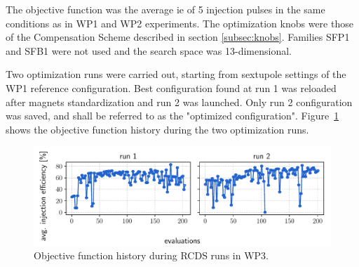 The objective function was the average \gls*{ie} of 5 injection pulses in the same conditions as in \gls*{WP1} and \gls*{WP2} experiments. The optimization knobs were those of the Compensation Scheme described in section \ref{subsec:knobs}. Families SFP1 and SFB1 were not used and the search space was 13-dimensional.

Two optimization runs were carried out, starting from sextupole settings of the \gls*{WP1} reference configuration. Best configuration found at run 1 was reloaded after magnets standardization and run 2 was launched. Only run 2 configuration was saved, and shall be referred to as the "optimized configuration". Figure~\ref{fig:wp3_history} shows the objective function history during the two optimization runs.
\begin{figure}[htb]
    \centering
    \includegraphics[width=\columnwidth]{Images/wp3_objfunc_hist.pdf}
    \caption[Objective function history during RCDS runs in WP3.]{Objective function history during \gls*{RCDS} runs in \gls*{WP3}.}
    \label{fig:wp3_history}
\end{figure}
